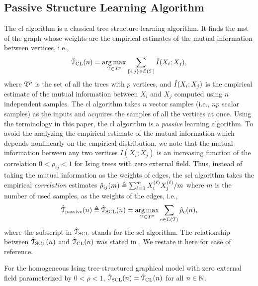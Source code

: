 \subsection{Passive Structure Learning Algorithm}\label{sec:pasivlearn}
The \ac{cl} algorithm is a classical tree structure learning algorithm\cite{chow1968approximating}. It finds the \ac{mst} of the graph whose weights are the empirical estimates of the mutual information between vertices, i.e.,
\begin{align}
	\hat{\mathcal{T}}_{\rm{CL}}(n)=\operatorname*{arg\,max}_{\mathcal{T}\in\mathfrak{T}^{p}} \sum_{\{i,j\}\in\mathcal{E}(\mathcal{T})} \hat{I}(X_{i};X_{j}),
\end{align}
where $\mathfrak{T}^{p}$ is the set of all the trees with $p$ vertices, and $\hat{I}(X_{i};X_{j})$ is the empirical estimate of the mutual information between $X_{i}$ and $X_{j}$ computed using $n$ independent samples. The \ac{cl} algorithm takes $n$ vector samples (i.e., $np$ 
scalar samples) as the inputs and acquires the samples of all the vertices at once. Using the terminology in this paper, the \ac{cl} algorithm is a   \emph{passive} learning algorithm. To avoid the analyzing the empirical estimate 
of the mutual information which depends nonlinearly on the empirical distribution, we note that the mutual information between any two vertices $I(X_{i};X_{j})$ is an increasing function of the correlation $0<\rho_{ij}<1$ for Ising trees with zero external field. Thus, instead of taking the mutual 
information as the weights of edges, the \ac{scl} algorithm takes the empirical {\em correlation} estimates  $\hat{\rho}_{ij}(m) \triangleq \sum_{\ell=1}^{m}X_{i}^{(\ell)}X_{j}^{(\ell)}/ m$ where $m$ is the number of used samples, as the weights of the edges, i.e.,
\begin{align}\label{eq:cl}
	\hat{\mathcal{T}}_{{\rm passive}}(n)\triangleq\hat{\mathcal{T}}_{\rm{SCL}}(n)=\operatorname*{arg\,max}_{\mathcal{T}\in\mathfrak{T}^{p}} \sum_{e\in\mathcal{E}(\mathcal{T})} \hat{\rho}_{e}(n),
\end{align}
where the subscript in $\hat{\mathcal{T}}_{\rm{SCL}}$ stands for the \ac{scl} algorithm. The relationship between $\hat{\mathcal{T}}_{\rm{SCL}}(n)$ and $\hat{\mathcal{T}}_{\rm{CL}}(n)$ was  stated in  \cite[Lemma~A.2]{bresler2020learning}. We restate it here  for ease of reference.
\begin{proposition} \label{prop:SCL}
	For the homogeneous Ising tree-structured graphical model with zero external field  parameterized by $0<\rho<1$, $\hat{\mathcal{T}}_{\rm{SCL}}(n)=\hat{\mathcal{T}}_{\rm{CL}}(n)$ for all $n\in\mathbb{N}$. 
\end{proposition}

